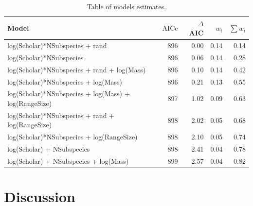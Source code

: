 \begin{table}[t]
\begin{tabular}{>{\small}lrrrr}

\normalsize{Model} & $\bar{\text{AICc}}$ & $\Delta$AIC & $w_i$ & $\sum w_i$\\
\hline
log(Scholar)*NSubspecies + rand & 
896 & 0.00 &
0.14 & 0.14\\
log(Scholar)*NSubspecies & 
896 & 0.06 &
0.14 & 0.28\\
log(Scholar)*NSubspecies + rand + log(Mass) & 
896 & 0.10 &
0.14 & 0.42\\
log(Scholar)*NSubspecies  + log(Mass) & 
896 & 0.21 &
0.13 & 0.55\\
log(Scholar)*NSubspecies  + log(Mass) + log(RangeSize) & 
897 & 1.02 &
0.09 & 0.63\\
log(Scholar)*NSubspecies  + rand + log(RangeSize) & 
898 & 2.02 &
0.05 & 0.68\\
log(Scholar)*NSubspecies  + log(RangeSize) & 
898 & 2.10 &
0.05 & 0.74\\
log(Scholar) + NSubspecies & 
898 & 2.41 &
0.04 & 0.78\\
log(Scholar) + NSubspecies + log(Mass) & 
899 & 2.57 &
0.04 & 0.82
\end{tabular}
\caption{Table of models estimates.}
\label{t:subsmodels}
\end{table}





\clearpage
\section{Discussion}  










